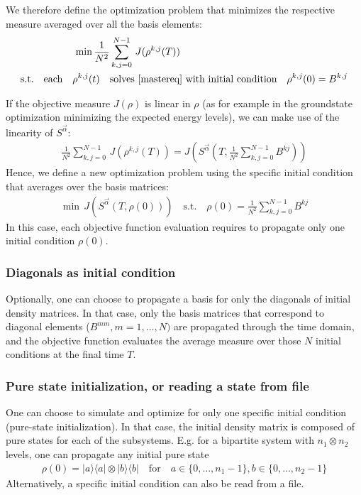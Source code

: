 \documentclass[letterpaper]{article}
\begin{document}
We therefore define the optimization problem that minimizes the respective
measure averaged over all the basis elements:
\begin{align}\label{optimproblem_basis}
  \min \frac{1}{N^2} & \sum_{k,j=0}^{N-1} \, J(\rho^{k,j}(T))  \\
  \text{s.t.} \quad  \text{each} \quad \rho^{k,j}(t) \quad & \text{solves
  \eqref{mastereq} with initial condition} \quad \rho^{k,j}(0) = B^{k,j}
\end{align}

If the objective measure $J(\rho)$ is linear in $\rho$ (as for example in the
groundstate optimization minimizing the expected energy levels), we can make use
of the linearity of $S^{\vec{\alpha}}$:
\begin{align}
   \frac{1}{N^2}  \sum_{k,j=0}^{N-1} \, J\left(\rho^{k,j}(T)\right) =
   J\left(S^{\vec{\alpha}}\left(T,\frac{1}{N^2}  \sum_{k,j=0}^{N-1}
   B^{kj}\right)\right)
\end{align}
Hence, we define a new optimization problem using the specific initial condition
that averages over the basis matrices:
\begin{align}
  \min \, J(S^{\vec{\alpha}}(T,\rho(0))) \quad \text{s.t.} \quad \rho(0) =
  \frac{1}{N^2}  \sum_{k,j=0}^{N-1} B^{kj}
\end{align}
In this case, each objective function evaluation requires to propagate only one
initial condition $\rho(0)$. 

\subsubsection{Diagonals as initial condition}
Optionally, one can choose to propagate a basis for only the diagonals of
initial density matrices. In that case, only the basis matrices that correspond
to diagonal elements ($B^{mm}, m=1,\dots,N)$ are propagated through the time
domain, and the objective function evaluates the average measure over those $N$
initial conditions at the final time $T$. 

\subsubsection{Pure state initialization, or reading a state from file}
One can choose to simulate and optimize for only one specific initial condition (pure-state initialization). In that case, the initial density matrix is composed
of pure states for each of the subsystems. E.g. for a bipartite system with $n_1
\otimes n_2$ levels, one can propagate any initial pure state 
\begin{align}
  \rho(0)  = |a\rangle \langle a| \otimes |b\rangle \langle b| \quad \text{for} \quad a \in \{0,\dots, n_1-1\}, b\in \{0,\dots, n_2-1\}
\end{align}
Alternatively, a specific initial condition can also be read from a file. 
\end{document}

